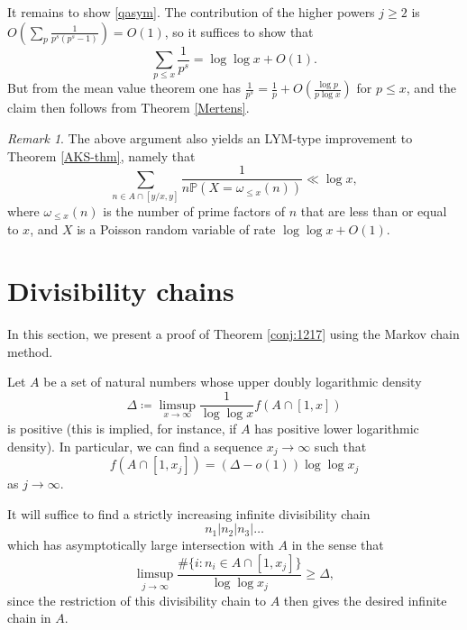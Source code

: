 \documentclass[12pt]{amsart}
\theoremstyle{definition}
\theoremstyle{remark}
\newtheorem{remark}[theorem]{Remark}
\numberwithin{equation}{section}
\newcommand{\1}{{\mathbf 1}}
\begin{document}
It remains to show \eqref{qasym}.  The contribution of the higher powers $j \geq 2$ is $O( \sum_p \frac{1}{p^s (p^s-1)}) = O(1)$, so it suffices to show that
$$ \sum_{p \leq x} \frac{1}{p^s} = \log\log x + O(1).$$
But from the mean value theorem one has $\frac{1}{p^s} = \frac{1}{p} + O(\frac{\log p}{p \log x})$ for $p \leq x$, and the claim then follows from Theorem \ref{Mertens}.

\begin{remark}\label{lym-rem} The above argument also yields an LYM-type improvement to Theorem \ref{AKS-thm}, namely that
$$ \sum_{n \in A \cap [y/x,y]} \frac{1}{n \mathbb{P}(X=\omega_{\leq x}(n))} \ll \log x,$$
where $\omega_{\leq x}(n)$ is the number of prime factors of $n$ that are less than or equal to $x$, and $X$ is a Poisson random variable of rate $\log\log x+O(1)$.
\end{remark}

\section{Divisibility chains}\label{divis-sec}

In this section, we present a proof of Theorem \ref{conj:1217} using the Markov chain method.

Let $A$ be a set of natural numbers whose upper doubly logarithmic density
$$ \Delta \coloneq \limsup_{x\to\infty}\frac{1}{\log\log x} f(A \cap [1,x])$$
is positive (this is implied, for instance, if $A$ has positive lower logarithmic density).  In particular, we can find a sequence $x_j \to\infty$ such that
\begin{equation}\label{fax}
 f(A \cap [1,x_j]) = (\Delta-o(1)) \log\log x_j
 \end{equation}
as $j \to \infty$.

It will suffice to find a strictly increasing infinite divisibility chain
$$ n_1 | n_2 | n_3 | \dots$$
which has asymptotically large intersection with $A$ in the sense that
$$ \limsup_{j \to \infty} \frac{\# \{ i: n_i \in A \cap [1,x_j]\}}{\log\log x_j} \geq \Delta,$$
since the restriction of this divisibility chain to $A$ then gives the desired infinite chain in $A$.
\end{document}

